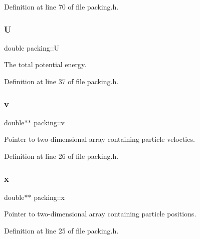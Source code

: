 Definition at line 70 of file packing.\+h.

\mbox{\label{classpacking_a4412ad37535700fcf62fb9e3d87c2c49}} 
\subsubsection{\texorpdfstring{U}{U}}
{\footnotesize\ttfamily double packing\+::U\hspace{0.3cm}{\ttfamily [protected]}}



The total potential energy. 



Definition at line 37 of file packing.\+h.

\mbox{\label{classpacking_a25a8813f1efa77beae413fe335bec3a7}} 
\subsubsection{\texorpdfstring{v}{v}}
{\footnotesize\ttfamily double$\ast$$\ast$ packing\+::v\hspace{0.3cm}{\ttfamily [protected]}}



Pointer to two-\/dimensional array containing particle velocties. 



Definition at line 26 of file packing.\+h.

\mbox{\label{classpacking_a3b56d5b429817628d1cd764f4a62827d}} 
\subsubsection{\texorpdfstring{x}{x}}
{\footnotesize\ttfamily double$\ast$$\ast$ packing\+::x\hspace{0.3cm}{\ttfamily [protected]}}



Pointer to two-\/dimensional array containing particle positions. 



Definition at line 25 of file packing.\+h.

\mbox{\label{classpacking_a8c37b117034cced906a5232358752725}} 
